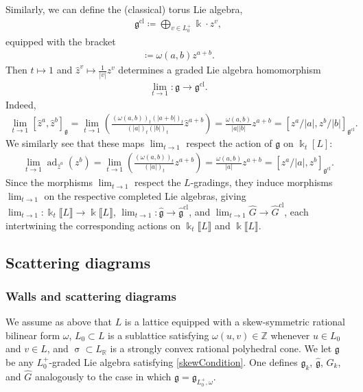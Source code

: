 \documentclass{amsart}
\DeclareMathOperator{\cl}{cl}
\DeclareMathOperator{\ad}{ad}
\let\llb=\llbracket
\let\rrb=\rrbracket
\let\bb=\mathbb
\let\rar=\rightarrow
\let\f=\mathfrak
\newcommand {\kk} {\Bbbk}
\newcommand {\kt} {\kk_t}
\renewcommand{\sigma}{\upsigma}
\theoremstyle{plain}%
\theoremstyle{definition}
\theoremstyle{remark}
\begin{document}
Similarly, we can define the (classical) torus Lie algebra,
\begin{align*}
 \f{g}^{\cl}\coloneqq \bigoplus_{v\in L_0^+} \kk\cdot z^v,
\end{align*}
equipped with the bracket
\begin{align*}
    [z^a,z^b]\coloneqq \omega(a,b) z^{a+b}.
\end{align*}
Then $t\mapsto 1$ and $\hat{z}^v\mapsto \frac{1}{|v|}z^v$ determines a graded Lie algebra homomorphism
\begin{align*}
    \lim_{t\rar 1}\colon \f{g}\rar \f{g}^{\cl}.
\end{align*}
Indeed,
\begin{align*}
    \lim_{t\rar 1} [\hat{z}^a,\hat{z}^b]_{\f{g}}=\lim_{t\rar 1}\left(\frac{(\omega(a,b))_{t}(|a+b|)_{t}}{(|a|)_{t}(|b|)_{t}} \hat{z}^{a+b}\right) = \frac{\omega(a,b)}{|a||b|}z^{a+b}=[z^a/|a|,z^b/|b|]_{\f{g}^{\cl}}.
\end{align*}
We similarly see that these maps $\lim_{t\rar 1}$ respect the action of $\f{g}$ on $\kk_t[L]$: 
\begin{align*}
        \lim_{t\rar 1} \ad_{\hat{z}^a}(z^b)=\lim_{t\rar 1}\left(\frac{(\omega(a,b))_{t}}{(|a|)_{t}} z^{a+b}\right) = \frac{\omega(a,b)}{|a|}z^{a+b}=[z^a/|a|,z^b]_{\f{g}^{\cl}}.
\end{align*}
Since the morphisms $\lim_{t\rar 1}$ respect the $L$-gradings, they induce morphisms $\lim_{t\rar 1}$ on the respective completed Lie algebras, giving $\lim_{t\rar 1} \colon  \kk_t\llb L\rrb \rar \kk\llb L\rrb$, $\lim_{t\rar 1} \colon \hat{\f{g}}\rar \hat{\f{g}}^{\cl}$, and $\lim_{t\rar 1} \hat{G}\rar \hat{G}^{\cl}$, each intertwining the corresponding actions on $\kt\llb L\rrb$ and $\kk\llb L\rrb$.


\subsection{Scattering diagrams}\label{WallScat}



\subsubsection{Walls and scattering diagrams}

We assume as above that $L$ is a lattice equipped with a skew-symmetric rational bilinear form $\omega$, $L_0\subset L$ is a sublattice satisfying $\omega(u,v)\in \bb{Z}$ whenever $u\in L_0$ and $v\in L$, and $\sigma\subset L_{\mathbb{R}}$ is a strongly convex rational polyhedral cone.  We let $\mathfrak{g}$ be any $L_0^+$-graded Lie algebra satisfying \eqref{skewCondition}.  One defines $\f{g}_k$, $\hat{\f{g}}$, $G_k$, and $\hat{G}$ analogously to the case in which $\f{g}=\f{g}_{L_0^+,\omega}$.
\end{document}
